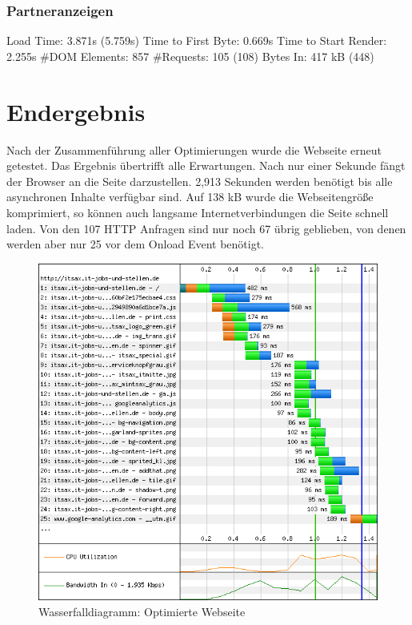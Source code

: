 \subsubsection{Partneranzeigen}
Load Time: 3.871s (5.759s)
Time to First Byte: 0.669s %
Time to Start Render: 2.255s
\#DOM Elements: 857 	
\#Requests: 105 (108)
Bytes In: 417 kB (448)


\section{Endergebnis} 
Nach der Zusammenführung aller Optimierungen wurde die Webseite erneut getestet. Das Ergebnis übertrifft alle Erwartungen. Nach nur einer Sekunde fängt der Browser an die Seite darzustellen. 2,913 Sekunden werden benötigt bis alle asynchronen Inhalte verfügbar sind. Auf 138 kB wurde die Webseitengröße komprimiert, so können auch langsame Internetverbindungen die Seite schnell laden. Von den 107 HTTP Anfragen sind nur noch 67 übrig geblieben, von denen werden aber nur 25 vor dem Onload Event benötigt. 
\begin{figure}[htbp]
  \centering
  \includegraphics[scale=0.5]{material/end_waterfall.png}
  \caption{Wasserfalldiagramm: Optimierte Webseite}
  \label{fig:endwaterfall}
\end{figure}

